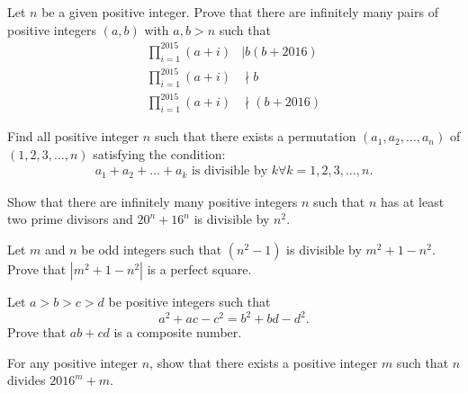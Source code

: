 \documentclass[problems.tex]{subfile}
\begin{document}
	\begin{problem}
		Let $n$ be a given positive integer. Prove that there are infinitely many pairs of positive integers $(a, b)$ with $a, b > n$ such that
		\begin{align*}
			\prod_{i=1}^{2015} (a+i) &\mid b(b+2016)\\
			\prod_{i=1}^{2015} (a+i) &\nmid b\\
			\prod_{i=1}^{2015} (a+i) &\nmid (b+2016)
		\end{align*}
	\end{problem}



	\begin{problem}
		Find all positive integer $n$ such that there exists a permutation $(a_1, a_2,\dots , a_n)$ of $(1, 2,3, \dots, n)$ satisfying the condition:
		\begin{align*}
			a_1 + a_2 + \ldots+ a_k \text{ is divisible by } k \forall k = 1,2, 3,\dots, n.
		\end{align*}
	\end{problem}



	\begin{problem}
		Show that there are infinitely many positive integers $n$ such that $n$ has at least two prime divisors and $20^n + 16^n$ is divisible by $n^2$.
	\end{problem}



	\begin{problem}
		Let $m$ and $n$ be odd integers such that $(n^2 - 1)$ is divisible by $m^2 + 1 - n^2$. Prove that $|m^2 + 1 - n^2|$ is a perfect square.
	\end{problem}




	\begin{problem}
		Let $a > b > c > d$ be positive integers such that $$a^2 + ac - c^2 = b^2 + bd - d^2.$$ Prove that $ab + cd$ is a composite number.
	\end{problem}


	\begin{problem}
		For any positive integer $n$, show that there exists a positive integer $m$ such that $n$ divides $2016^m + m$.
	\end{problem}
\end{document}
